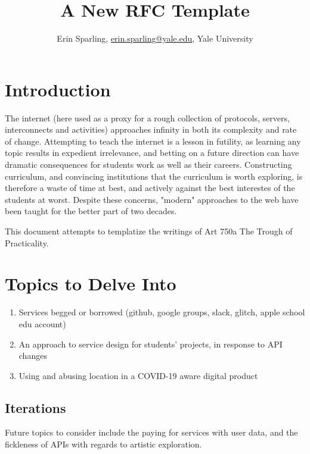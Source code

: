 \documentclass[12pt]{article}
\title{\LARGE A New RFC Template}
\author{Erin Sparling, \href{mailto:erin.sparling@yale.edu}{erin.sparling@yale.edu}, Yale University}
\begin{document}
\maketitle

\tableofcontents

\thispagestyle{empty}



\newpage

\section{Introduction}

The internet (here used as a proxy for a rough collection of protocols, servers, interconnects and activities) approaches infinity in both its complexity and rate of change. Attempting to teach the internet is a lesson in futility, as learning any topic results in expedient irrelevance, and betting on a future direction can have dramatic consequences for students work as well as their careers. Constructing curriculum, and convincing institutions that the curriculum is worth exploring, is therefore a waste of time at best, and actively against the best interestes of the students at worst. Despite these concerns, "modern" approaches to the web have been taught for the better part of two decades.

This document attempts to templatize the writings of Art 750a The Trough of Practicality.

\section*{Topics to Delve Into}

\begin{enumerate}
    \item Services begged or borrowed (github, google groups, slack, glitch, apple school edu account)
    \item An approach to service design for students' projects, in response to API changes
    \item Using and abusing location in a COVID-19 aware digital product \cite{CONTACT-TRACING}
\end{enumerate}

\newpage


\subsection{Iterations}
Future topics to consider include the paying for services with user data, and the fickleness of APIs with regards to artistic exploration.
\end{document}
